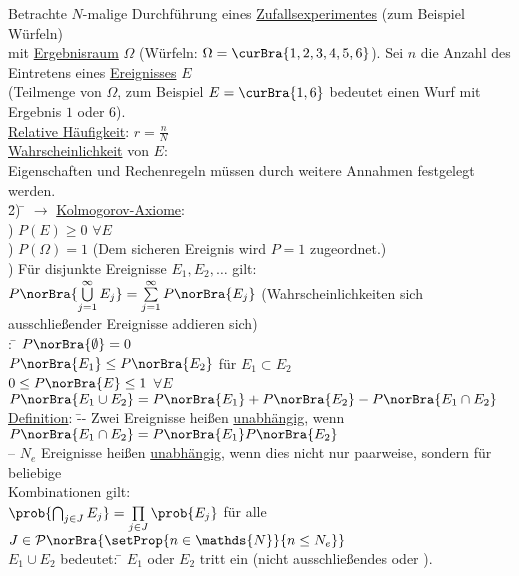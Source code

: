 \begin{tabbing}
Betrachte $N$-malige Durchführung eines \underline{Zufallsexperimentes} (zum Beispiel Würfeln)\\
mit \underline{Ergebnisraum} $\Omega$ (Würfeln: $\Omega = \curBra{1,2,3,4,5,6}$). Sei $n$ die Anzahl des Eintretens eines \underline{Ereignisses} $E$\\
(Teilmenge von $\Omega$, zum Beispiel $E = \curBra{1,6}$ bedeutet einen Wurf mit Ergebnis $1$ oder $6$).\\
\underline{Relative Häufigkeit}: $r = \frac{n}{N}$\\
\underline{Wahrscheinlichkeit} von $E$: \\
Eigenschaften und Rechenregeln müssen durch weitere Annahmen festgelegt werden.\\
\hspace{4em} \= 2) \= \kill
$\rightarrow$\> \underline{Kolmogorov-Axiome}:\\
) \>$P(E) \geq 0$ $\forall E$\\
) \>$P(\Omega) = 1$ (Dem sicheren Ereignis wird $P = 1$ zugeordnet.)\\
) \>Für disjunkte Ereignisse $E_1, E_2, \dots$ gilt:\\
\>\> $P\norBra{\bigcup\limits_{j = 1}^{\infty}E_j} = \sum\limits_{j = 1}^{\infty} P\norBra{E_j}$ (Wahrscheinlichkeiten sich ausschließender Ereignisse addieren sich)\\
:  \= $P\norBra{\emptyset} = 0$\\
\> $P\norBra{E_1} \leq P\norBra{E_2}$ für $E_1 \subset E_2$\\
\> $0\leq P\norBra{E} \leq 1$ $\forall E$\\
\> $P\norBra{E_1 \cup E_2} = P\norBra{E_1} + P\norBra{E_2} - P\norBra{E_1 \cap E_2}$\\
\underline{Definition}:  \= -- Zwei Ereignisse heißen \underline{unabhängig}, wenn $P\norBra{E_1 \cap E_2} = P\norBra{E_1}P\norBra{E_2}$\\
\> -- $N_e$ Ereignisse heißen \underline{unabhängig}, wenn dies nicht nur paarweise, sondern für beliebige\\
\> Kombinationen gilt:\\
\> $\prob{\bigcap_{j\in J} E_j} = \prod\limits_{j\in J} \prob{E_j}$ für alle $J \in \mathcal{P}\norBra{\setProp{n\in \mathds{N}}{n \leq N_e}}$\\
$E_1 \cup E_2$ bedeutet: \= $E_1$ oder $E_2$ tritt ein (nicht ausschließendes \glqq oder \grqq).\\

\end{tabbing}

